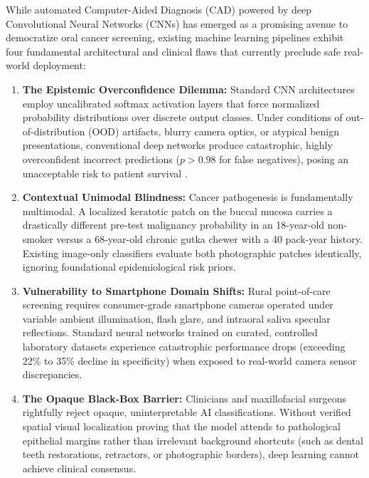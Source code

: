 \documentclass[12pt,a4paper,oneside]{report}
\begin{document}
While automated Computer-Aided Diagnosis (CAD) powered by deep Convolutional Neural Networks (CNNs) has emerged as a promising avenue to democratize oral cancer screening, existing machine learning pipelines exhibit four fundamental architectural and clinical flaws that currently preclude safe real-world deployment:

\begin{enumerate}[label=\arabic*.]
    \item \textbf{The Epistemic Overconfidence Dilemma:} Standard CNN architectures employ uncalibrated softmax activation layers that force normalized probability distributions over discrete output classes. Under conditions of out-of-distribution (OOD) artifacts, blurry camera optics, or atypical benign presentations, conventional deep networks produce catastrophic, highly overconfident incorrect predictions ($p > 0.98$ for false negatives), posing an unacceptable risk to patient survival \cite{guo2017calibration}.
    
    \item \textbf{Contextual Unimodal Blindness:} Cancer pathogenesis is fundamentally multimodal. A localized keratotic patch on the buccal mucosa carries a drastically different pre-test malignancy probability in an 18-year-old non-smoker versus a 68-year-old chronic gutka chewer with a 40 pack-year history. Existing image-only classifiers evaluate both photographic patches identically, ignoring foundational epidemiological risk priors.
    
    \item \textbf{Vulnerability to Smartphone Domain Shifts:} Rural point-of-care screening requires consumer-grade smartphone cameras operated under variable ambient illumination, flash glare, and intraoral saliva specular reflections. Standard neural networks trained on curated, controlled laboratory datasets experience catastrophic performance drops (exceeding 22\% to 35\% decline in specificity) when exposed to real-world camera sensor discrepancies.
    
    \item \textbf{The Opaque Black-Box Barrier:} Clinicians and maxillofacial surgeons rightfully reject opaque, uninterpretable AI classifications. Without verified spatial visual localization proving that the model attends to pathological epithelial margins rather than irrelevant background shortcuts (such as dental teeth restorations, retractors, or photographic borders), deep learning cannot achieve clinical consensus.
\end{enumerate}
\end{document}
